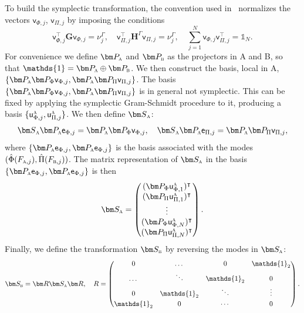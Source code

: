 \documentclass[letterpaper,12pt,titlepage,oneside,final]{book}
\newcommand{\openone}{\mathds{1}}
\newcommand{\mf}{\mathsf}%
\newcommand{\tc}[1]{\textsc{#1}}
\begin{document}
To build the symplectic transformation, the convention used in~\cite{KlcoEntStrQFTI} normalizes the vectors $\mf v_{\Phi,j}$, $\mf v_{\Pi,j}$ by imposing the conditions
\begin{equation}
    \mf v_{\Phi,j}^\intercal\bm G \mf v_{\Phi,j} = \nu_j^\Gamma, \quad \mf v_{\Pi,j}^\intercal\bm H^\Gamma \mf v_{\Pi,j} = \nu_j^\Gamma, \quad\sum_{j=1}^{N} \mf v_{\Phi,j}\mf v_{\Pi,j}^\intercal = \openone_{N}.
\end{equation}
For convenience we define $\bm P_\tc{a}$ and $\bm P_\tc{b}$ as the projectors in A and B, so that $\openone = \bm P_\tc{a}\oplus \bm P_\tc{b}$. We then construct the basis, local in A, $\{\bm P_\tc{a} \bm P_\Phi\mf v_{\Phi,j},\bm P_\tc{a} \bm P_\Pi \mf v_{\Pi,j}\}$. The basis $\{\bm P_\tc{a} \bm P_\Phi\mf v_{\Phi,j},\bm P_\tc{a} \bm P_\Pi \mf v_{\Pi,j}\}$ is in general not symplectic. This can be fixed by applying the symplectic Gram-Schmidt procedure to it, producing a basis $\{\mf u_{\Phi,j}^\tc{a},\mf u^\tc{a}_{\Pi,j}\}$. We then define ${\bm S}_\tc{a}$:
\begin{equation}
     {{\bm S}}_\tc{a}\bm P_\tc{a} \mf e_{\Phi,j} = \bm P_{\tc{a}}\bm P_\Phi \mf v_{\Phi,j},\quad
     {\bm S}_\tc{a}\bm P_{\tc{a}}\mf e_{\Pi,j} = \bm P_{\tc{a}}\bm P_\Pi \mf v_{\Pi,j},
\end{equation}
where $\{\bm P_{\tc{a}}\mf e_{\Phi,j},\bm P_{\tc{a}}\mf e_{\Phi,j}\}$ is the basis associated with the modes $(\hat{\Phi}(F_{\tc{a},j}),\hat{\Pi}(F_{\tc{b},j}))$.  The matrix representation of $\bm S_\tc{a}$ in the basis $\{\bm P_{\tc{a}}\mf e_{\Phi,j},\bm P_{\tc{a}}\mf e_{\Phi,j}\}$ is then
\begin{equation}
    \bm S_\tc{a} = \begin{pmatrix}
        (\bm P_\Phi \mf u_{\Phi,1}^\tc{a})^\intercal\\
        (\bm P_\Pi \mf u_{\Pi,1}^\tc{a})^\intercal\\
        \vdots\\
        (\bm P_\Phi \mf u_{\Phi,N}^\tc{a})^\intercal\\
        (\bm P_\Pi \mf u_{\Pi,N}^\tc{a})^\intercal
    \end{pmatrix}.
\end{equation}
Finally, we define the transformation $\bm S_\tc{b}$ by reversing the modes in $\bm S_\tc{a}$:
\begin{equation}
    \bm S_\tc{b} = \bm R \bm S_\tc{a} \bm R, \quad R = \begin{pmatrix}
        0 & \dots & 0 & \openone_2\\[1mm]
   \dots & \ddots & \openone_2 & 0\\[1mm]
   0 & \openone_2 & \ddots & \vdots\\[1mm]
   \openone_2 & 0 &\cdots  & 0
    \end{pmatrix}.
\end{equation}
\end{document}

